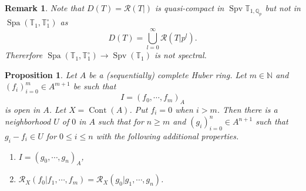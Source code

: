\documentclass[8pt]{article}
\numberwithin{equation}{section}
\newtheorem{proposition}{Proposition}[subsection]
\newtheorem{remark}{Remark}[subsection]
\DeclareMathOperator{\id}{id}
\DeclareMathOperator{\Spa}{Spa}
\DeclareMathOperator{\Spv}{Spv}
\DeclareMathOperator{\Cont}{Cont}
\newcommand{\N}[0]{\mathbb{N}}
\newcommand{\Q}[0]{\mathbb{Q}}
\newcommand{\T}[0]{\mathbb{T}}
\newcommand{\cR}[0]{\mathcal{R}}
\begin{document}
\begin{remark}
    \label{remark_18_5}
    Note that $D(T) = \cR(T|)$ is quasi-compact in $\Spv\T_{1,\Q_p}$ but not in $\Spa(\T_1,\T_1^\circ)$ as 
    \begin{equation*}
        D(T) = \bigcup_{l=0}^\infty \cR(T|p^l).
    \end{equation*}
    Thererfore $\Spa(\T_1,\T_1^\circ)\to \Spv(\T_1)$ is not spectral.
\end{remark}
\begin{proposition}
    \label{proposition_18_3}
    Let $A$ be a (sequentially) complete Huber ring. %
    Let $m\in \N$ and $(f_i)_{i=0}^m\in A^{m+1}$ be such that 
    \begin{equation*}
        I=(f_0,\cdots,f_m)_A
    \end{equation*}
    is open in $A$. Let $X=\Cont(A)$. Put $f_i=0$ when $i>m$. Then there is a neighborhood $U$ of $0$ in $A$ such that for $n\geq m$ and $(g_i)_{i=0}^n\in A^{n+1}$ such that $g_i-f_i\in U$ for $0\leq i\leq n$ with the following additional properties.
    \begin{enumerate}[1.]
        \item $I=( g_0,\cdots,g_n)_A$, 
        \item $\cR_X(f_0|f_1,\cdots,f_m)=\cR_X(g_0|g_1,\cdots,g_n)$.
    \end{enumerate}
\end{proposition}
\end{document}
